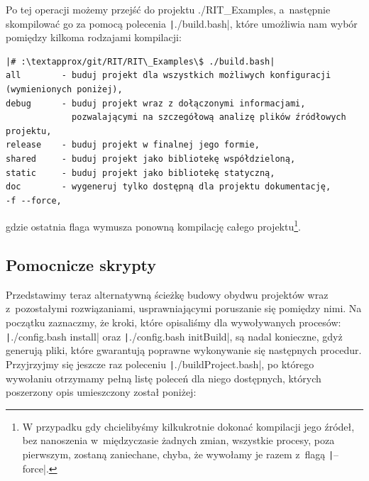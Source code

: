 Po tej operacji możemy przejść do projektu \textsf{./RIT\_Examples}, a~następnie skompilować go za pomocą polecenia \texttt|./build.bash|, które umożliwia nam wybór pomiędzy kilkoma rodzajami kompilacji:

\begin{verbatim}
|# :\textapprox/git/RIT/RIT\_Examples\$ ./build.bash|
all        - buduj projekt dla wszystkich możliwych konfiguracji (wymienionych poniżej),
debug      - buduj projekt wraz z dołączonymi informacjami,
             pozwalającymi na szczegółową analizę plików źródłowych projektu,
release    - buduj projekt w finalnej jego formie,
shared     - buduj projekt jako bibliotekę współdzieloną,
static     - buduj projekt jako bibliotekę statyczną,
doc        - wygeneruj tylko dostępną dla projektu dokumentację,
-f --force,
\end{verbatim}
gdzie ostatnia flaga wymusza ponowną kompilację całego projektu\footnote{W przypadku gdy chcielibyśmy kilkukrotnie dokonać kompilacji jego źródeł, bez nanoszenia w~międzyczasie żadnych zmian, wszystkie procesy, poza pierwszym, zostaną zaniechane, chyba, że wywołamy je razem z~flagą \texttt|--force|.}. 

\subsection{Pomocnicze skrypty}

Przedstawimy teraz alternatywną ścieżkę budowy obydwu projektów wraz z~pozostałymi rozwiązaniami, usprawniającymi poruszanie się pomiędzy nimi. Na początku zaznaczmy, że kroki, które opisaliśmy dla wywoływanych procesów: \texttt|./config.bash install| oraz \texttt|./config.bash initBuild|, są nadal konieczne, gdyż generują pliki, które gwarantują poprawne wykonywanie się następnych procedur. Przyjrzyjmy się jeszcze raz poleceniu \texttt|./buildProject.bash|, po którego wywołaniu otrzymamy pełną listę poleceń dla niego dostępnych, których poszerzony opis umieszczony został poniżej:

